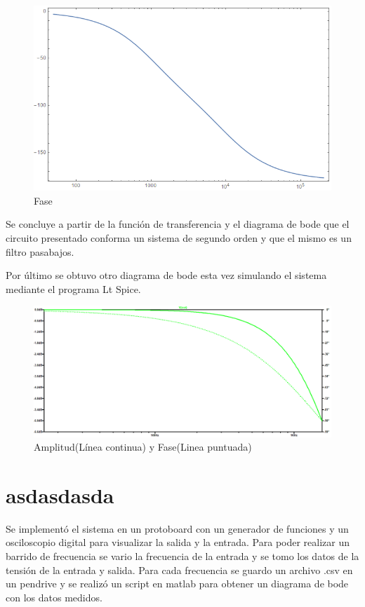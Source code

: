 \documentclass[10pt,a4paper]{article} %
\begin{document}
\begin{figure}[H]
	\begin{center}
		\includegraphics[scale=0.5]{bode2}
		\caption{Fase}
	\end{center}
\end{figure}
Se concluye a partir de la función de transferencia y el diagrama de bode que el circuito presentado conforma un sistema de segundo orden y que el mismo es un filtro pasabajos.

Por último se obtuvo otro diagrama de bode esta vez simulando el sistema mediante el programa Lt Spice. 
\begin{figure}[H]
	\begin{center}
		\includegraphics[scale=0.4]{bode3}
		\caption{Amplitud(Línea continua) y Fase(Linea puntuada)}
	\end{center}
\end{figure}
\section{asdasdasda}

Se implementó el sistema en un protoboard con un generador de funciones y un osciloscopio digital para visualizar la salida y la entrada. Para poder realizar un barrido de frecuencia se vario la frecuencia de la entrada y se tomo los datos de la tensión de la entrada y salida. 
Para cada frecuencia se guardo un archivo .csv en un pendrive y se realizó un script en matlab para obtener un diagrama de bode con los datos medidos.
\end{document}
